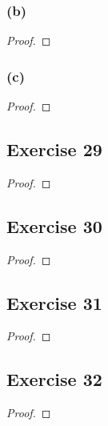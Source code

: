 \documentclass[14pt]{extarticle}
\begin{document}
\subsubsection{(b)}

\begin{proof}

\end{proof}

\subsubsection{(c)}

\begin{proof}

\end{proof}

\subsection{Exercise 29}

\begin{proof}

\end{proof}

\subsection{Exercise 30}

\begin{proof}

\end{proof}

\subsection{Exercise 31}

\begin{proof}

\end{proof}

\subsection{Exercise 32}

\begin{proof}

\end{proof}
\end{document}
